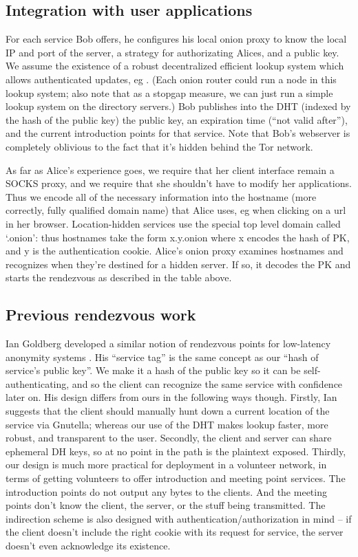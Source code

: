 \documentclass[times,10pt,twocolumn]{article}
\begin{document}
\subsection{Integration with user applications}

For each service Bob offers, he configures his local onion proxy to know
the local IP and port of the server, a strategy for authorizating Alices,
and a public key. We assume the existence of a robust decentralized
efficient lookup system which allows authenticated updates, eg
\cite{cfs:sosp01}. (Each onion router could run a node in this lookup
system; also note that as a stopgap measure, we can just run a simple
lookup system on the directory servers.)  Bob publishes into the DHT
(indexed by the hash of the public key) the public key, an expiration
time (``not valid after''), and the current introduction points for that
service. Note that Bob's webserver is completely oblivious to the fact
that it's hidden behind the Tor network.

As far as Alice's experience goes, we require that her client interface
remain a SOCKS proxy, and we require that she shouldn't have to modify
her applications. Thus we encode all of the necessary information into
the hostname (more correctly, fully qualified domain name) that Alice
uses, eg when clicking on a url in her browser. Location-hidden services
use the special top level domain called `.onion': thus hostnames take the
form x.y.onion where x encodes the hash of PK, and y is the authentication
cookie. Alice's onion proxy examines hostnames and recognizes when they're
destined for a hidden server. If so, it decodes the PK and starts the
rendezvous as described in the table above.

\subsection{Previous rendezvous work}

Ian Goldberg developed a similar notion of rendezvous points for
low-latency anonymity systems \cite{ian-thesis}. His ``service tag''
is the same concept as our ``hash of service's public key''. We make it
a hash of the public key so it can be self-authenticating, and so the
client can recognize the same service with confidence later on. His
design differs from ours in the following ways though. Firstly, Ian
suggests that the client should manually hunt down a current location of
the service via Gnutella; whereas our use of the DHT makes lookup faster,
more robust, and transparent to the user. Secondly, the client and server
can share ephemeral DH keys, so at no point in the path is the plaintext
exposed. Thirdly, our design is much more practical for deployment in a
volunteer network, in terms of getting volunteers to offer introduction
and meeting point services. The introduction points do not output any
bytes to the clients. And the meeting points don't know the client,
the server, or the stuff being transmitted. The indirection scheme
is also designed with authentication/authorization in mind -- if the
client doesn't include the right cookie with its request for service,
the server doesn't even acknowledge its existence.
\end{document}
